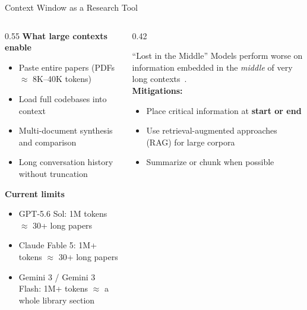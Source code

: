 \begin{frame}[shrink=8]{Context Window as a Research Tool}
  \begin{columns}[T, onlytextwidth]
    \begin{column}{0.55\textwidth}
      \textbf{What large contexts enable}\\[0.3em]
      \begin{itemize}
        \item Paste entire papers (PDFs $\approx$ 8K--40K tokens)
        \item Load full codebases into context
        \item Multi-document synthesis and comparison
        \item Long conversation history without truncation
      \end{itemize}
      \vspace{0.5em}
      \textbf{Current limits}\\[0.3em]
      \begin{itemize}
        \item GPT-5.6 Sol: 1M tokens $\approx$ 30+ long papers
        \item Claude Fable 5: 1M+ tokens $\approx$ 30+ long papers
        \item Gemini 3 / Gemini 3 Flash: 1M+ tokens $\approx$ a whole library section
      \end{itemize}
    \end{column}
    \hfill
    \begin{column}{0.42\textwidth}
      \begin{alertblock}{``Lost in the Middle''}
        Models perform worse on information embedded in the \emph{middle} of very long contexts~\parencite{liu2023lostmiddle}.\\[0.5em]
        \textbf{Mitigations:}
        \begin{itemize}
          \item Place critical information at \textbf{start or end}
          \item Use retrieval-augmented approaches (RAG) for large corpora
          \item Summarize or chunk when possible
        \end{itemize}
      \end{alertblock}
    \end{column}
  \end{columns}
\end{frame}


